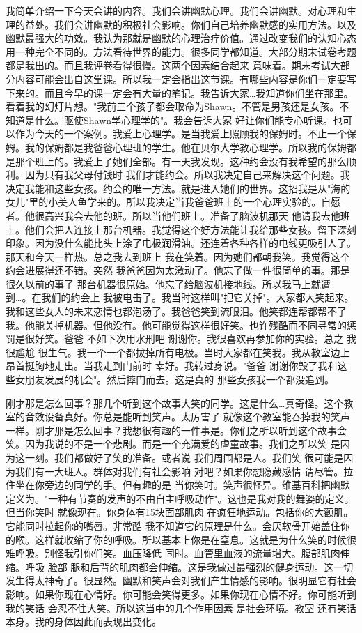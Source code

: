 我简单介绍一下今天会讲的内容。我们会讲幽默心理。我们会讲幽默。对心理和生理的益处。我们会讲幽默的积极社会影响。你们自己培养幽默感的实用方法。以及幽默最强大的功效。我认为那就是幽默的心理治疗价值。通过改变我们的认知心态 用一种完全不同的。方法看待世界的能力。很多同学都知道。大部分期末试卷考题都是我出的。而且我评卷看得很慢。这两个因素结合起来 意味着。期末考试大部分内容可能会出自这堂课。所以我一定会指出这节课。有哪些内容是你们一定要写下来的。而且今早的课一定会有大量的笔记。我告诉大家…我知道你们坐在那里。看着我的幻灯片想。"我前三个孩子都会取命为Shawn。不管是男孩还是女孩。不知道是什么。驱使Shawn学心理学的"。我会告诉大家 好让你们能专心听课。也可以作为今天的一个案例。我爱上心理学。是当我爱上照顾我的保姆时。不止一个保姆。我的保姆都是我爸爸心理班的学生。他在贝尔大学教心理学。所以我的保姆都是那个班上的。我爱上了她们全部。有一天我发现。这种约会没有我希望的那么顺利。因为只有我父母付钱时 我们才能约会。所以我决定自己来解决这个问题。我决定我能和这些女孩。约会的唯一方法。就是进入她们的世界。这招我是从"海的女儿"里的小美人鱼学来的。所以我决定当我爸爸班上的一个心理实验的。自愿者。他很高兴我会去他的班。所以当他们班上。准备了脑波机那天 他请我去他班上。他们会把人连接上那台机器。我觉得这个好方法能让我给那些女孩。留下深刻印象。因为没什么能比头上涂了电极润滑油。还连着各种各样的电线更吸引人了。那天和今天一样热。总之我去到班上 我在笑着。因为她们都朝我笑。我觉得这个约会进展得还不错。突然 我爸爸因为太激动了。他忘了做一件很简单的事。那是很久以前的事了 那台机器很原始。他忘了给脑波机接地线。所以我马上就遭到…。在我们的约会上 我被电击了。我当时这样叫"把它关掉"。大家都大笑起来。我和这些女人的未来恋情也都泡汤了。我爸爸笑到流眼泪。他笑都连帮都帮不了我。他能关掉机器。但他没有。他可能觉得这样很好笑。也许残酷而不同寻常的惩罚是很好笑。爸爸 不如下次用水刑吧 谢谢你。我很喜欢再参加你的实验。总之 我很尴尬 很生气。我一个一个都拔掉所有电极。当时大家都在笑我。我从教室边上昂首挺胸地走出。当我走到门前时 幸好。我转过身说。"爸爸 谢谢你毁了我和这些女朋友发展的机会"。然后摔门而去。这是真的 那些女孩我一个都没追到。 

刚才那是怎么回事？那几个听到这个故事大笑的同学。这是什么…真奇怪。这个教室的音效设备真好。你总是能听到笑声。太厉害了 就像这个教室能吞掉我的笑声一样。刚才那是怎么回事？我想很有趣的一件事是。你们之所以听到这个故事会笑。因为我说的不是一个悲剧。而是一个充满爱的虐童故事。我们之所以笑 是因为这一刻。我们都做好了笑的准备。或者说 我们周围都是人。我们笑 很可能是因为我们有一大班人。群体对我们有社会影响 对吧？如果你想隐藏感情 请尽管。拉住坐在你旁边的同学的手。但有趣的是 当你笑时。笑声很怪异。维基百科把幽默定义为。"一种有节奏的发声的不由自主呼吸动作"。这也是我对我的舞姿的定义。但当你笑时 就像现在。你身体有15块面部肌肉 在疯狂地运动。包括你的大颧肌。它能同时拉起你的嘴唇。非常酷 我不知道它的原理是什么。会厌软骨开始盖住你的喉。这样就收缩了你的呼吸。所以基本上你是在窒息。这就是为什么笑的时候很难呼吸。别怪我引你们笑。血压降低 同时。血管里血液的流量增大。腹部肌肉伸缩。呼吸 脸部 腿和后背的肌肉都会伸缩。这是我做过最强烈的健身运动。这一切发生得太神奇了。很显然。幽默和笑声会对我们产生情感的影响。很明显它有社会影响。如果你现在心情好。你可能会笑得更多。如果你现在心情不好。你可能听到我的笑话 会忍不住大笑。所以这当中的几个作用因素 是社会环境。教室 还有笑话本身。我的身体因此而表现出变化。 

